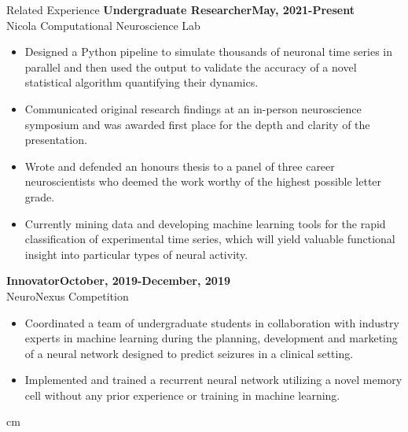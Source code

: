 \documentclass[12pt]{resume}
\begin{document}
\begin{rSection}{\Large Related Experience}
    {\bf Undergraduate Researcher\hfill {May, 2021-Present}}\\
    Nicola Computational Neuroscience Lab
    \begin{itemize}
        \setlength\itemsep{-0.5em}
        \item Designed a Python pipeline to simulate thousands of neuronal time series in parallel and then used the 
        output to validate the accuracy of a novel statistical algorithm quantifying their dynamics.
        \item Communicated original research findings at an in-person neuroscience symposium and was awarded
        first place for the depth and clarity of the presentation.
        \item Wrote and defended an honours thesis to a panel of three career neuroscientists who deemed the work 
        worthy of the highest possible letter grade. 
        \item Currently mining data and developing machine learning tools for the rapid classification of experimental
        time series, which will yield valuable functional insight into particular types of neural activity. 
    \end{itemize}
    {\bf Innovator\hfill {October, 2019-December, 2019}}\\
    NeuroNexus Competition
    \begin{itemize}
        \setlength\itemsep{-0.5em}
        \item Coordinated a team of undergraduate students in collaboration with industry experts in machine 
        learning during the planning, development and marketing of a neural network designed to predict 
        seizures in a clinical setting.
        \item Implemented and trained a recurrent neural network utilizing a novel memory cell without any 
        prior experience or training in machine learning. 
    \end{itemize}
\end{rSection}
\vspace{12pt}
\advance{} cm
\end{document}
